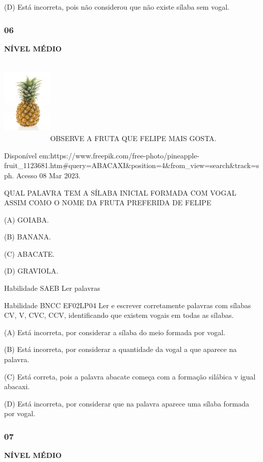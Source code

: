 (D) Está incorreta, pois não considerou que não existe sílaba sem vogal.

\subsubsection{06 }\label{section-99}

\textbf{NÍVEL MÉDIO}

\includegraphics[width=0.94236in,height=1.64306in]{media/image143.jpeg}OBSERVE
A FRUTA QUE FELIPE MAIS GOSTA.

Disponível
em:https://www.freepik.com/free-photo/pineapple-fruit\_1123681.htm\#query=ABACAXI\&position=4\&from\_view=search\&track=sph.
Acesso 08 Mar 2023.

\protect\hypertarget{_Hlk129270648}{}{}QUAL PALAVRA TEM A SÍLABA INICIAL
FORMADA COM VOGAL ASSIM COMO O NOME DA FRUTA PREFERIDA DE FELIPE

(A) GOIABA.

(B) BANANA.

(C) ABACATE.

(D) GRAVIOLA.

Habilidade SAEB Ler palavras

Habilidade BNCC EF02LP04 Ler e escrever corretamente palavras com
sílabas CV, V, CVC, CCV, identificando que existem vogais em todas as
sílabas.

(A) Está incorreta, por considerar a sílaba do meio formada por vogal.

(B) Está incorreta, por considerar a quantidade da vogal a que aparece
na palavra.

(C) Está correta, pois a palavra abacate começa com a formação silábica
v igual abacaxi.

(D) Está incorreta, por considerar que na palavra aparece uma sílaba
formada por vogal.

\subsubsection{07}\label{section-100}

\textbf{NÍVEL MÉDIO}

